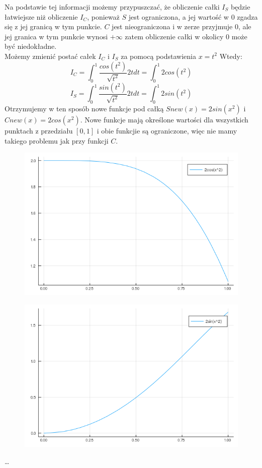 \documentclass{article}
\begin{document}
Na podstawie tej informacji możemy przypuszczać, że obliczenie całki $I_S$ będzie łatwiejsze niż obliczenie $I_C$, ponieważ $S$ jest ograniczona, a jej wartość w $0$ zgadza się z jej granicą w tym punkcie. $C$ jest nieograniczona i w zerze przyjmuje $0$, ale jej granica w tym punkcie wynosi $+\infty$ zatem obliczenie całki w okolicy $0$ może być niedokładne.\\
Możemy zmienić postać całek $I_C$ i $I_S$ za pomocą podstawienia $x=t^2$ Wtedy:
\begin{equation}
I_C = \int_0^1 \frac{cos(t^2)}{\sqrt{t^2}} 2tdt = \int_0^1 2cos(t^2)
\end{equation}
\begin{equation}
I_S = \int_0^1 \frac{sin(t^2)}{\sqrt{t^2}} 2tdt = \int_0^1 2sin(t^2)
\end{equation}
Otrzymujemy w ten sposób nowe funkcje pod całką $Snew(x) = 2sin(x^2)$ i $Cnew(x) = 2cos(x^2)$. Nowe funkcje mają określone wartości dla wszystkich punktach z przedziału $[0,1]$ i obie funkcjie są ograniczone, więc nie mamy takiego problemu jak przy funkcji $C$.
\begin{figure}[ht]
    \includegraphics[scale=0.5]{WykresCnew.png}
    \label{wykresCnew}
\end{figure}
\begin{figure}[ht]
    \includegraphics[scale=0.5]{WykresSnew.png}
    \label{WykresSnew}
\end{figure}
\dots
\end{document}
